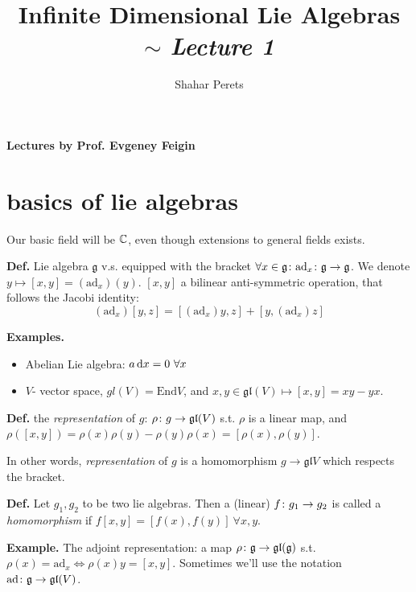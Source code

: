 \documentclass[]{../../../../tex/classes/styledArticle}
\author{Shahar Perets}
\title{Infinite Dimensional Lie Algebras $\sim$ \textit{Lecture 1}}
\newcommand\gl {\mathfrak{gl}}
\newcommand\g  {\mathfrak{g}}
\newcommand\ad {\mathrm{ad}}
\begin{document}
	\maketitle
	
	\textbf{Lectures by Prof. Evgeney Feigin}
	
	
	\section{basics of lie algebras}
	Our basic field will be $\mathbb{C}$, even though extensions to general fields exists. 
	
	\textbf{Def. }Lie algebra $\g$ v.s. equipped with the bracket $\forall x \in \g\co \ad_x \co \g \to \g$. We denote $y \mapsto [x, y] = (\ad_x)(y)$. $[x, y]$ a bilinear  anti-symmetric operation, that follows the Jacobi identity: 
	\[ (\ad_x)[y, z] = [(\ad_x)y, z] + [y, (\ad_x)z] \]
	
	\textbf{Examples. }
	\begin{itemize}
		\item Abelian Lie algebra: $a\dx = 0 \ \forall x$
		\item $V$- vector space, $gl(V) = \mathrm{End} V$, and $x, y \in \gl(V) \mapsto [x, y] = xy - yx$. 
	\end{itemize}
	
	\textbf{Def. }the \textit{representation} of $g$: $\rho \co g \to \gl(V)$ s.t. $\rho$ is a linear map, and $\rho([x, y]) = \rho(x)\rho(y) - \rho(y)\rho(x) = [\rho(x), \rho(y)]$. 
	
	In other words, \textit{representation} of $g$ is a homomorphism $g \to \gl V$ which respects the bracket. 
	
	\textbf{Def. }Let $g_1, g_2$ to be two lie algebras. Then a (linear) $f \colon g_1 \to g_2$ is called a \textit{homomorphism} if $f[x, y] = [f(x), f(y)]\ \forall x, y$. 
	
	\textbf{Example. }The adjoint representation: a map $\rho \co \g \to \gl(\g)$ s.t. $\rho(x) = \ad_x \iff \rho(x)y = [x, y]$. Sometimes we'll use the notation $\ad\co \g \to \gl(V)$. 
	
\end{document}
